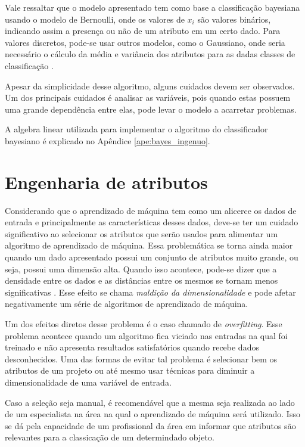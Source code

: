 Vale ressaltar que o modelo apresentado tem como base a classificação
bayesiana usando o modelo de Bernoulli, onde os valores de $x_{i}$ são valores
binários, indicando assim a presença ou não de um atributo em um certo dado.
Para valores discretos, pode-se usar outros modelos, como o Gaussiano, onde
seria necessário o cálculo da média e variância dos atributos para as dadas
classes de classificação \cite{zhang2004optimality}.

Apesar da simplicidade desse algoritmo, alguns cuidados devem ser observados.
Um dos principais cuidados é analisar as variáveis, pois quando estas possuem uma grande
dependência entre elas, pode levar o modelo a acarretar problemas.

A algebra linear utilizada para implementar o algoritmo do classificador
bayesiano é explicado no Apêndice \ref{ape:bayes_ingenuo}.

\section{Engenharia de atributos}

Considerando que o aprendizado de máquina tem como um alicerce os dados de entrada
e principalmente as características desses dados, deve-se ter um cuidado
significativo ao selecionar os atributos que serão usados para alimentar um
algoritmo de aprendizado de máquina. Essa problemática se torna ainda maior
quando um dado apresentado possui um conjunto de atributos muito grande, ou
seja, possui uma dimensão alta. Quando isso acontece, pode-se dizer que a
densidade entre os dados e as distâncias entre os mesmos se tornam menos
significativas \cite{amatriain2011data}. Esse efeito se chama \textit{maldição
da dimensionalidade} e pode afetar negativamente um série de algoritmos de
aprendizado de máquina.

Um dos efeitos diretos desse problema é o caso chamado de \textit{overfitting}.
Esse problema acontece quando um algoritmo fica viciado nas entradas na qual foi
treinado e não apresenta resultados satisfatórios quando recebe dados desconhecidos.
Uma das formas de evitar tal problema é selecionar bem os atributos
de um projeto ou até mesmo usar técnicas para diminuir a dimensionalidade de uma
variável de entrada.

Caso a seleção seja manual, é recomendável que a mesma seja realizada ao lado de
um especialista na área na qual o aprendizado de máquina será utilizado. Isso se
dá pela capacidade de um profissional da área em informar que atributos são
relevantes para a classicação de um determindado objeto.

